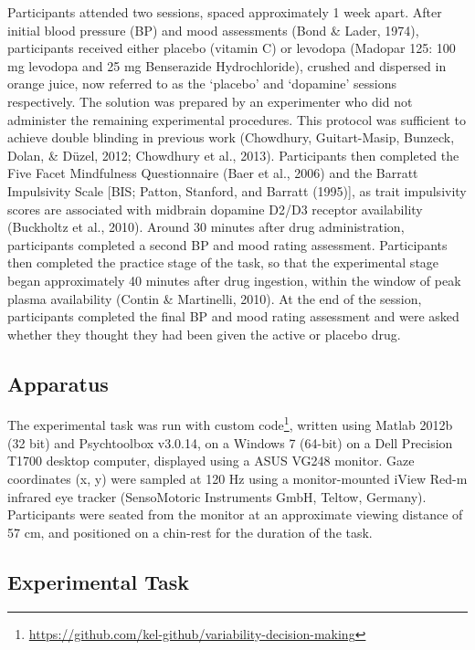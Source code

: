 \documentclass[
  man]{apa6}
\begin{document}
Participants attended two sessions, spaced approximately 1 week apart. After initial blood pressure (BP) and mood assessments (Bond \& Lader, 1974), participants received either placebo (vitamin C) or levodopa (Madopar 125: 100 mg levodopa and 25 mg Benserazide Hydrochloride), crushed and dispersed in orange juice, now referred to as the `placebo' and `dopamine' sessions respectively. The solution was prepared by an experimenter who did not administer the remaining experimental procedures. This protocol was sufficient to achieve double blinding in previous work (Chowdhury, Guitart-Masip, Bunzeck, Dolan, \& Düzel, 2012; Chowdhury et al., 2013). Participants then completed the Five Facet Mindfulness Questionnaire (Baer et al., 2006) and the Barratt Impulsivity Scale {[}BIS; Patton, Stanford, and Barratt (1995){]}, as trait impulsivity scores are associated with midbrain dopamine D2/D3 receptor availability (Buckholtz et al., 2010). Around 30 minutes after drug administration, participants completed a second BP and mood rating assessment. Participants then completed the practice stage of the task, so that the experimental stage began approximately 40 minutes after drug ingestion, within the window of peak plasma availability (Contin \& Martinelli, 2010). At the end of the session, participants completed the final BP and mood rating assessment and were asked whether they thought they had been given the active or placebo drug.

\hypertarget{apparatus}{%
\subsection{Apparatus}\label{apparatus}}

\label{sec:Apparatus}

The experimental task was run with custom code\footnote{\url{https://github.com/kel-github/variability-decision-making}}, written using Matlab 2012b (32 bit) and Psychtoolbox v3.0.14, on a Windows 7 (64-bit) on a Dell Precision T1700 desktop computer, displayed using a ASUS VG248 monitor. Gaze coordinates (x, y) were sampled at 120 Hz using a monitor-mounted iView Red-m infrared eye tracker (SensoMotoric Instruments GmbH, Teltow, Germany). Participants were seated from the monitor at an approximate viewing distance of 57 cm, and positioned on a chin-rest for the duration of the task.

\hypertarget{experimental-task}{%
\subsection{Experimental Task}\label{experimental-task}}
\end{document}
